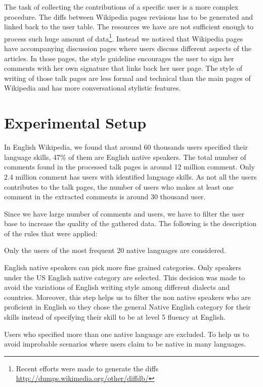 \documentclass[10pt,a5paper,twoside]{article}
\begin{document}
The task of collecting the contributions of a specific user is a more complex
procedure. The diffs between Wikipedia pages revisions has to be generated and
linked back to the user table. The resources we have are not sufficient enough to process such
huge amount of data\footnote{Recent efforts were
made to generate the diffs \url{http://dumps.wikimedia.org/other/diffdb/}}.
Instead we noticed that Wikipedia pages have accompanying discussion pages where
users discuss different aspects of the articles. In those pages, the style
guideline encourages the user to sign her comments with her own signature that
links back her user page. The style of writing of those
talk pages are less formal and technical than the main pages of Wikipedia and has more conversational stylistic features.

\section{Experimental Setup}
\label{setup}
In English Wikipedia, we found that around 60 thousands users specified their language skills, 47\% of
them are English native speakers. The total number of comments found in the
processed talk pages is around 12 million comment. Only 2.4 million comment has users with identified language skills. As not all the users contributes to the talk pages, the number of users who makes at least one comment in the extracted comments is around 30 thousand user.

Since we have large number of comments and users, we have to filter the user
base to increase the quality of the gathered data. The following is the
description of the rules that were applied:
\begin{compactitem}
\item Only the users of the most frequent 20 native languages are considered.
\item English native speakers can pick more fine grained categories. Only
  speakers under the US English native category are selected. This decision was made to avoid the
  variations of English writing style among different dialects and countries. Moreover,
  this step helps us to filter the non native speakers who are proficient in
  English so they chose the general Native English category for their skills
  instead of specifying their skill to be at level 5 fluency at English.
\item Users who specified more than one native language are excluded. To help
  us to avoid improbable scenarios where users claim to be native in many
languages.
\end{compactitem}
\end{document}
